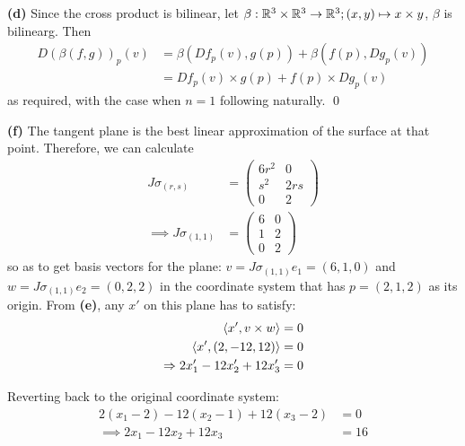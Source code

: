 \documentclass[a4paper, 12pt]{article}
\begin{document}
\begin{solution}
    \textbf{(d)} Since the cross product is bilinear, let $\beta: \mathbb{R}^3 \times \mathbb{R}^3 \to \mathbb{R}^3; (x, y) \mapsto x \times y$, $\beta$ is bilinearg. Then
    \begin{align*}
        D(\beta(f, g))_p(v) & = \beta(Df_{p}(v), g(p)) + \beta(f(p) , Dg_p(v)) \\
                            & = Df_p(v) \times g(p) + f(p) \times Dg_p(v)
    \end{align*}
    as required, with the case when $n = 1$ following naturally. \qed

    \textbf{(f)} The tangent plane is the best linear approximation of the surface at that point. Therefore, we can calculate \begin{align*}
        J\sigma_{(r, s)}          & = \begin{pmatrix}
                                          6r^2 & 0   \\
                                          s^2  & 2rs \\
                                          0    & 2
                                      \end{pmatrix} \\
        \implies J\sigma_{(1, 1)} & = \begin{pmatrix}
                                          6 & 0 \\
                                          1 & 2 \\
                                          0 & 2
                                      \end{pmatrix}
    \end{align*}
    so as to get basis vectors for the plane: $v = J\sigma_{(1, 1)}e_1 = (6, 1, 0)$ and $w = J\sigma_{(1, 1)}e_2 = (0, 2, 2)$ in the coordinate system that has $p = (2, 1, 2)$ as its origin. From \textbf{(e)}, any $x'$ on this plane has to satisfy:
    \begin{align*}
        \langle x', v \times w \rangle          & = 0 \\
        \langle x', (2, -12, 12) \rangle        & = 0 \\
        \Rightarrow 2x'_1 -12x'_2 + 12x'_3 & = 0
    \end{align*}

    Reverting back to the original coordinate system:
    \begin{align*}
        2(x_1 - 2) - 12(x_2 - 1) + 12 (x_3 - 2) & = 0  \\
        \implies 2x_1 - 12x_2 + 12x_3           & = 16
    \end{align*}


\end{solution}
\end{document}
